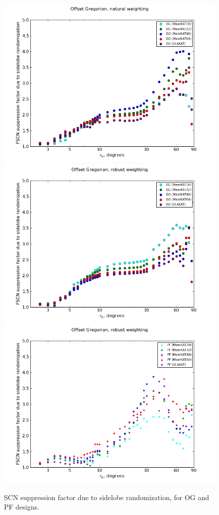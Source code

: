 \documentclass{aa}
\begin{document}
\begin{figure}
\end{figure}

\begin{figure}
  \includegraphics[width=.33\textwidth]{cc-meerkatjes-rrsupp-og-nat}\hfill%
  \includegraphics[width=.33\textwidth]{cc-meerkatjes-rrsupp-og}\hfill%
  \includegraphics[width=.33\textwidth]{cc-meerkatjes-rrsupp-pf}
\caption{\label{fig:fscn-meerkatjes-rr-suppression}SCN suppression factor due to sidelobe randomization, for OG and PF designs.}

\end{figure}
\end{document}
